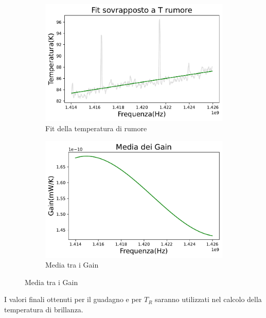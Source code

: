 \begin{figure}[H]
\centering

\begin{subfigure}[h!]{0.49\textwidth}
	\includegraphics[width=\textwidth]{Fit_T_rumore.pdf}
	\caption{Fit della temperatura di rumore}
    \label{fig:sub1}
\end{subfigure}
\hfill
\begin{subfigure}[h!]{0.49\textwidth}
    \includegraphics[width=\textwidth]{Media_Gain.pdf}
    \caption{Media tra i Gain}
    \label{fig:sub2}
\end{subfigure}
\end{figure}



I valori finali ottenuti per il guadagno e per $T_{R}$ saranno utilizzati nel calcolo della temperatura di brillanza.





